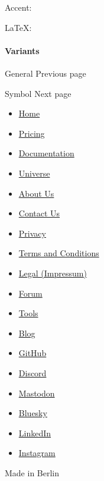 Accent:


LaTeX: \texttt{\ }

\paragraph{Variants}\label{variants}

{ }

\href{/docs/reference/symbols/sym/}{\pandocbounded{}}

{ General } { Previous page }

\href{/docs/reference/symbols/symbol/}{\pandocbounded{}}

{ Symbol } { Next page }

\begin{itemize}
\tightlist
\item
  \href{/}{Home}
\item
  \href{/pricing/}{Pricing}
\item
  \href{/docs/}{Documentation}
\item
  \href{/universe/}{Universe}
\item
  \href{/about/}{About Us}
\item
  \href{/contact/}{Contact Us}
\item
  \href{/privacy/}{Privacy}
\item
  \href{https://typst.app/terms}{Terms and Conditions}
\item
  \href{/legal/}{Legal (Impressum)}
\end{itemize}

\begin{itemize}
\tightlist
\item
  \href{https://forum.typst.app}{Forum}
\item
  \href{/tools/}{Tools}
\item
  \href{/blog/}{Blog}
\item
  \href{https://github.com/typst/}{GitHub}
\item
  \href{https://discord.gg/2uDybryKPe}{Discord}
\item
  \href{https://mastodon.social/@typst}{Mastodon}
\item
  \href{https://bsky.app/profile/typst.app}{Bluesky}
\item
  \href{https://www.linkedin.com/company/typst/}{LinkedIn}
\item
  \href{https://instagram.com/typstapp/}{Instagram}
\end{itemize}

Made in Berlin
